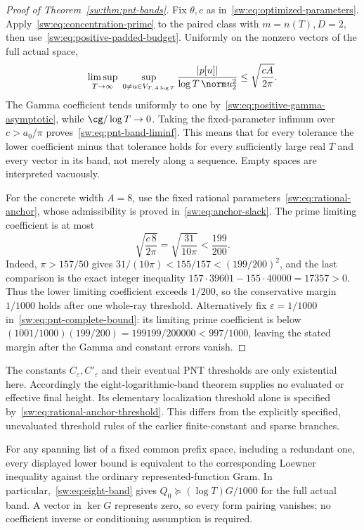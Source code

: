 \documentclass[11pt,a4paper]{article}
\numberwithin{equation}{section}
\theoremstyle{definition}\newtheorem{definition}[theorem]{Definition}
\theoremstyle{remark}\newtheorem{remark}[theorem]{Remark}
\begin{document}
\begin{proof}[Proof of Theorem~\ref{sw:thm:pnt-bands}]
Fix $\theta,c$ as in~\eqref{sw:eq:optimized-parameters}. Apply~\eqref{sw:eq:concentration-prime} to the paired class with $m=n(T),D=2$, then use~\eqref{sw:eq:positive-padded-budget}. Uniformly on the nonzero vectors of the full actual space,
\[
 \limsup_{T\to\infty}\ \sup_{0\ne u\in V_{T,A\log T}}
 \frac{|p[u]|}{\log T\,\norm u_2^2}
 \le\sqrt{\frac{cA}{2\pi}}.
\]
The Gamma coefficient tends uniformly to one by~\eqref{sw:eq:positive-gamma-asymptotic}, while $\cg/\log T\to0$. Taking the fixed-parameter infimum over $c>a_0/\pi$ proves~\eqref{sw:eq:pnt-band-liminf}. This means that for every tolerance the lower coefficient minus that tolerance holds for every sufficiently large real $T$ and every vector in its band, not merely along a sequence. Empty spaces are interpreted vacuously.

For the concrete width $A=8$, use the fixed rational parameters~\eqref{sw:eq:rational-anchor}, whose admissibility is proved in~\eqref{sw:eq:anchor-slack}. The prime limiting coefficient is at most
\[
 \sqrt{\frac{c\,8}{2\pi}}=\sqrt{\frac{31}{10\pi}}<\frac{199}{200}.
\]
Indeed, $\pi>157/50$ gives $31/(10\pi)<155/157<(199/200)^2$, and the last comparison is the exact integer inequality
$157\cdot39601-155\cdot40000=17357>0$.
Thus the lower limiting coefficient exceeds $1/200$, so the conservative margin $1/1000$ holds after one whole-ray threshold. Alternatively fix $\varepsilon=1/1000$ in~\eqref{sw:eq:pnt-complete-bound}: its limiting prime coefficient is below
$(1001/1000)(199/200)=199199/200000<997/1000$, leaving the stated margin after the Gamma and constant errors vanish.
\end{proof}
The constants $C_\varepsilon,C'_\varepsilon$ and their eventual PNT thresholds are only existential here. Accordingly the eight-logarithmic-band theorem supplies no evaluated or effective final height. Its elementary localization threshold alone is specified by~\eqref{sw:eq:rational-anchor-threshold}. This differs from the explicitly specified, unevaluated threshold rules of the earlier finite-constant and sparse branches.

For any spanning list of a fixed common prefix space, including a redundant one, every displayed lower bound is equivalent to the corresponding Loewner inequality against the ordinary represented-function Gram. In particular,~\eqref{sw:eq:eight-band} gives $Q_0\succeq(\log T)G/1000$ for the full actual band. A vector in $\ker G$ represents zero, so every form pairing vanishes; no coefficient inverse or conditioning assumption is required.
\end{document}
